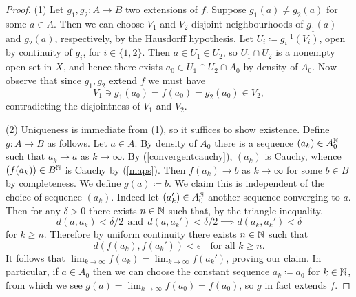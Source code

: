 \begin{proof}
  (1) Let $g_1,g_2 : A \to B$ two extensions of $f$. Suppose $g_1(a)
  \ne g_2(a)$ for some $a \in A$. Then we can choose $V_1$ and $V_2$
  disjoint neighbourhoods of $g_1(a)$ and $g_2(a)$, respectively, by
  the Hausdorff hypothesis. Let $U_i \coloneqq g_i^{-1}(V_i)$, open by
  continuity of $g_i$, for $i \in \{1,2\}$. Then $a \in U_1 \in U_2$,
  so $U_1 \cap U_2$ is a nonempty open set in $X$, and hence there
  exists $a_0 \in U_1 \cap U_2 \cap A_0$ by density of $A_0$. Now
  observe that since $g_1,g_2$ extend $f$ we must have
  \[
  V_1 \ni g_1(a_0) = f(a_0) = g_2(a_0) \in V_2,
  \]
  contradicting the disjointness of $V_1$ and $V_2$.

  \medskip
  (2) Uniqueness is immediate from (1), so it suffices to show
  existence. Define $g : A \to B$ as follows. Let $a \in A$. By
  density of $A_0$ there is a sequence $(a_k) \in A_0^{\mathbb{N}}$ such that
  $a_k \to a$ as $k \to \infty$. By (\ref{convergentcauchy}), $(a_k)$
  is Cauchy, whence $(f(a_k)) \in B^{\mathbb{N}}$ is Cauchy by
  (\ref{maps}). Then $f(a_k) \to b$ as $k \to \infty$ for some $b \in
  B$ by completeness. We define $g(a) \coloneqq b$. We claim this is
  independent of the choice of sequence $(a_k)$. Indeed let $(a_k')
  \in A_0^{\mathbb{N}}$ another sequence converging to $a$. Then for any $\delta
  > 0$ there exists $n \in \mathbb{N}$ such that, by the triangle inequality,
  \[
  d(a,a_k) < \delta/2\ \ \text{and}\ \ d(a,a_k') < \delta/2 \implies
  d(a_k,a_k') < \delta
  \]
  for $k \ge n$. Therefore by uniform continuity there exists $n \in
  \mathbb{N}$ such that
  \[
  d(f(a_k),f(a_k')) < \epsilon \quad\text{for all }k \ge n.
  \]
  It follows that $\lim_{k \to \infty} f(a_k) = \lim_{k \to \infty}
  f(a_k')$, proving our claim. In particular, if $a \in A_0$ then we
  can choose the constant sequence $a_k \coloneqq a_0$ for $k \in \mathbb{N}$,
  from which we see $g(a) = \lim_{k \to \infty} f(a_0) = f(a_0)$, so
  $g$ in fact extends $f$.


\end{proof}
